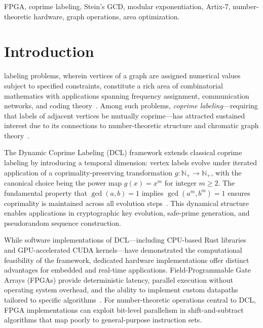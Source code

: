 \documentclass[lettersize,journal]{IEEEtran}
\begin{document}
\begin{IEEEkeywords}
FPGA, coprime labeling, Stein's GCD, modular exponentiation, Artix-7, number-theoretic hardware, graph operations, area optimization.
\end{IEEEkeywords}

\section{Introduction}
\label{sec:intro}

 labeling problems, wherein vertices of a graph are assigned numerical values subject to specified constraints, constitute a rich area of combinatorial mathematics with applications spanning frequency assignment, communication networks, and coding theory~\cite{gallian2021}. Among such problems, \emph{coprime labeling}---requiring that labels of adjacent vertices be mutually coprime---has attracted sustained interest due to its connections to number-theoretic structure and chromatic graph theory~\cite{bondy2008}.

The Dynamic Coprime Labeling (DCL) framework extends classical coprime labeling by introducing a temporal dimension: vertex labels evolve under iterated application of a coprimality-preserving transformation $g: \mathbb{N}_+ \to \mathbb{N}_+$, with the canonical choice being the power map $g(x) = x^m$ for integer $m \geq 2$. The fundamental property that $\gcd(a,b) = 1$ implies $\gcd(a^m, b^m) = 1$ ensures coprimality is maintained across all evolution steps~\cite{niven1991}. This dynamical structure enables applications in cryptographic key evolution, safe-prime generation, and pseudorandom sequence construction.

While software implementations of DCL---including CPU-based Rust libraries and GPU-accelerated CUDA kernels---have demonstrated the computational feasibility of the framework, dedicated hardware implementations offer distinct advantages for embedded and real-time applications. Field-Programmable Gate Arrays (FPGAs) provide deterministic latency, parallel execution without operating system overhead, and the ability to implement custom datapaths tailored to specific algorithms~\cite{xilinxug474}. For number-theoretic operations central to DCL, FPGA implementations can exploit bit-level parallelism in shift-and-subtract algorithms that map poorly to general-purpose instruction sets.
\end{document}
